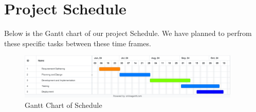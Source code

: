 \section{Project Schedule}
Below is the Gantt chart of our project Schedule. We have planned to perfrom these specific tasks between these time frames.
\begin{figure}[H]
    \centering
        \includegraphics[width=400px]{Diagrams/Online Gantt 20240617.png}
    \caption{Gantt Chart of Schedule}
\end{figure}